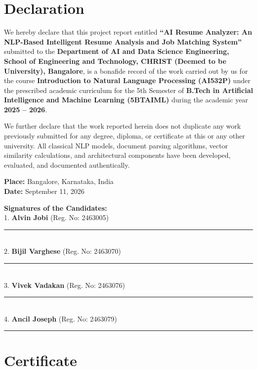 \documentclass[12pt,a4paper]{report}
\begin{document}
\newpage
\chapter*{Declaration}
\thispagestyle{plain}

We hereby declare that this project report entitled \textbf{“AI Resume Analyzer: An NLP-Based Intelligent Resume Analysis and Job Matching System”} submitted to the \textbf{Department of AI and Data Science Engineering, School of Engineering and Technology, CHRIST (Deemed to be University), Bangalore}, is a bonafide record of the work carried out by us for the course \textbf{Introduction to Natural Language Processing (AI532P)} under the prescribed academic curriculum for the 5th Semester of \textbf{B.Tech in Artificial Intelligence and Machine Learning (5BTAIML)} during the academic year \textbf{2025 -- 2026}.

We further declare that the work reported herein does not duplicate any work previously submitted for any degree, diploma, or certificate at this or any other university. All classical NLP models, document parsing algorithms, vector similarity calculations, and architectural components have been developed, evaluated, and documented authentically.

\vspace{1.5cm}
\noindent
\textbf{Place:} Bangalore, Karnataka, India\\
\textbf{Date:} September 11, 2026

\vspace{1.5cm}
\noindent
\textbf{Signatures of the Candidates:}\\[1cm]
1. \textbf{Alvin Jobi} (Reg. No: 2463005) \hfill \rule{4cm}{0.4pt}\\[0.8cm]
2. \textbf{Bijil Varghese} (Reg. No: 2463070) \hfill \rule{4cm}{0.4pt}\\[0.8cm]
3. \textbf{Vivek Vadakan} (Reg. No: 2463076) \hfill \rule{4cm}{0.4pt}\\[0.8cm]
4. \textbf{Ancil Joseph} (Reg. No: 2463079) \hfill \rule{4cm}{0.4pt}

\newpage
\chapter*{Certificate}
\thispagestyle{plain}
\end{document}
